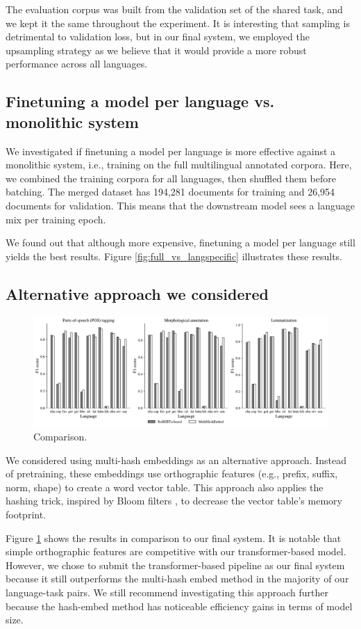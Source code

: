 \documentclass[11pt]{article}
\begin{document}
The evaluation corpus was built from the validation set of the shared task, and we kept it the same throughout the experiment.
It is interesting that sampling is detrimental to validation loss, but in our final system, we employed the upsampling strategy as we believe that it would provide a more robust performance across all languages.


\subsection{Finetuning a model per language vs. monolithic system}

We investigated if finetuning a model per language is more effective against a monolithic system, i.e., training on the full multilingual annotated corpora.
Here, we combined the training corpora for all languages, then shuffled them before batching.
The merged dataset has 194,281 documents for training and 26,954 documents for validation.
This means that the downstream model sees a language mix per training epoch.

We found out that although more expensive, finetuning a model per language still yields the best results. 
Figure \ref{fig:full_vs_langspecific} illustrates these results.


\subsection{Alternative approach we considered}

\begin{figure}[t]
\centering
\includegraphics[width=\textwidth]{figures/hashembed.pdf}
\caption{Comparison.}
\label{fig:hashembed}
\end{figure}

We considered using multi-hash embeddings \cite{miranda-etal-2022-multi} as an alternative approach.
Instead of pretraining, these embeddings use orthographic features (e.g., prefix, suffix, norm, shape) to create a word vector table.
This approach also applies the hashing trick, inspired by Bloom filters \cite{bloom-1970-space}, to decrease the vector table's memory footprint.

Figure \ref{fig:hashembed} shows the results in comparison to our final system.
It is notable that simple orthographic features are competitive with our transformer-based model.
However, we chose to submit the transformer-based pipeline as our final system because it still outperforms the multi-hash embed method in the majority of our language-task pairs. 
We still recommend investigating this approach further because the hash-embed method has noticeable efficiency gains in terms of model size.
\end{document}
